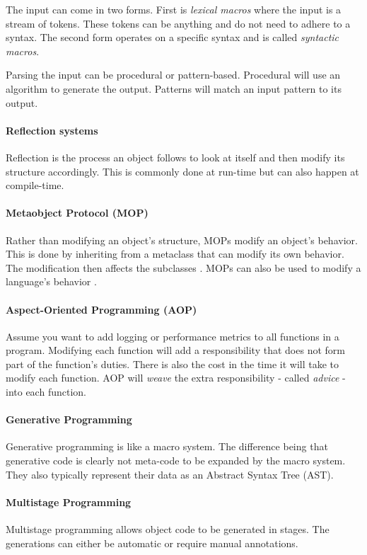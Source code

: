 The input can come in two forms.
First is \textit{lexical macros} where the input is a stream of tokens.
These tokens can be anything and do not need to adhere to a syntax.
The second form operates on a specific syntax and is called \textit{syntactic macros}.

Parsing the input can be procedural or pattern-based.
Procedural will use an algorithm to generate the output.
Patterns will match an input pattern to its output.

\paragraph{Reflection systems}
Reflection is the process an object follows to look at itself and then modify its structure accordingly.
This is commonly done at run-time but can also happen at compile-time.

\paragraph{Metaobject Protocol (MOP)}
Rather than modifying an object's structure, MOPs modify an object's behavior.
This is done by inheriting from a metaclass that can modify its own behavior.
The modification then affects the subclasses \cite{lee_95_01}.
MOPs can also be used to modify a language's behavior \cite{seaton_15_01}.

\paragraph{Aspect-Oriented Programming (AOP)}
Assume you want to add logging or performance metrics to all functions in a program.
Modifying each function will add a responsibility that does not form part of the function's duties.
There is also the cost in the time it will take to modify each function.
AOP will \textit{weave} the extra responsibility - called \textit{advice} - into each function.

\paragraph{Generative Programming}
Generative programming is like a macro system.
The difference being that generative code is clearly not meta-code to be expanded by the macro system.
They also typically represent their data as an Abstract Syntax Tree (AST). 

\paragraph{Multistage Programming}
Multistage programming allows object code to be generated in stages.
The generations can either be automatic or require manual annotations. \cite{sheard_01_01, taha_04_01}

